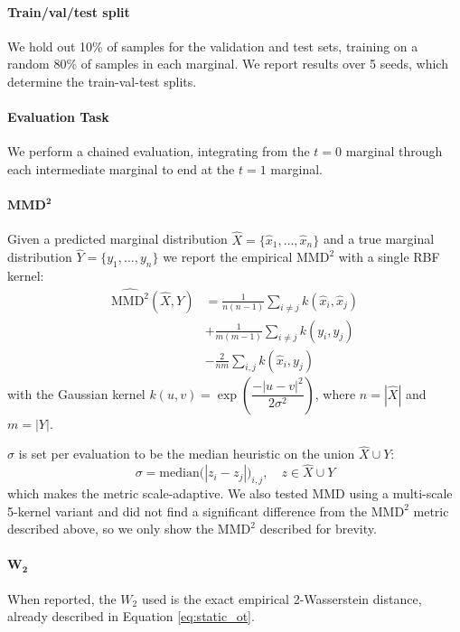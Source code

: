 \paragraph{Train/val/test split}
We hold out 10\% of samples for the validation and test sets, training on a random 80\% of samples in each marginal. We report results over 5 seeds, which determine the train-val-test splits.

\paragraph{Evaluation Task}
We perform a chained evaluation, integrating from the $t=0$ marginal through each intermediate marginal to end at the $t=1$ marginal. 

\paragraph{$\mathbf{MMD^2}$}
Given a predicted marginal distribution $\hat{X}=\{\hat{x}_1,\dots,\hat{x}_n\}$ and a true marginal distribution $\hat{Y}=\{y_1,\dots,y_n\}$ we report the empirical $\mathrm{MMD}^2$ with a single RBF kernel:
\begin{equation}
\begin{aligned}
\widehat{\mathrm{MMD}^2}(\hat{X},Y)
&=\frac{1}{n(n-1)}\sum_{i\neq j} k(\hat x_i, \hat x_j)\\
&+\frac{1}{m(m-1)}\sum_{i\ne j}k(y_i,y_j)\\
&-\frac{2}{nm}\sum_{i,j}k(\hat x_i, y_j)
\end{aligned}
\label{eq:mmd_sq}
\end{equation}
with the Gaussian kernel $k(u,v)=\exp\left(\dfrac{-|u-v|^2}{2\sigma^2}\right)$, where $n=|\hat X|$ and $m=|Y|$.

$\sigma$ is set per evaluation to be the median heuristic on the union $\hat X \cup Y$:
$$\sigma =\mathrm {median}\big(|z_i-z_j|\big)_{i,j},\quad z\in \hat X \cup Y$$
which makes the metric scale-adaptive.
We also tested MMD using a multi-scale 5-kernel variant and did not find a significant difference from the $\mathrm{MMD^2}$ metric described above, so we only show the $\mathrm{MMD^2}$ described for brevity.

\paragraph{$\mathbf{W_2}$}
When reported, the $W_2$ used is the exact empirical 2-Wasserstein distance, already described in Equation \ref{eq:static_ot}.

